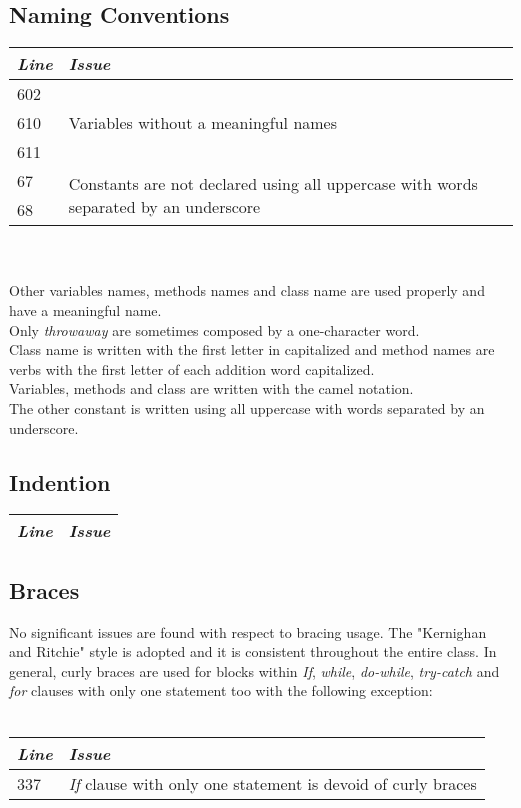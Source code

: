 \documentclass[11pt,a4paper]{report}
\begin{document}
\subsection{Naming Conventions}
\begin{tabularx}{\textwidth}{|l|X|}
	\hline
	\textit{Line} & \textit{Issue}\\
	\hline
	602 & \multirow{3}{*}{Variables without a meaningful names}\\
	610 & \\
	611 & \\
	\hline
	\hline
	67 & \multirow{2}{\linewidth}{{Constants are not declared using all uppercase with words separated by an underscore}}\\
	68 & \\
	\hline
\end{tabularx}
\\\\
Other variables names, methods names and class name are used properly and have a meaningful name.\\Only \textit{throwaway} are sometimes composed by a one-character word.\\Class name is written with the first letter in capitalized and method names are verbs with the first letter of each addition word capitalized.\\Variables, methods and class are written with the camel notation.\\The other constant is written using all uppercase with words separated by an underscore.
\subsection{Indention}
\begin{tabularx}{\textwidth}{|l|X|}
	\hline
	\textit{Line} & \textit{Issue}\\
	\hline
\end{tabularx}
\subsection{Braces}
No significant issues are found with respect to bracing usage. The "Kernighan and Ritchie" style is adopted and it is consistent throughout the entire class. In general, curly braces are used for blocks within \textit{If}, \textit{while}, \textit{do-while}, \textit{try-catch} and \textit{for} clauses with only one statement too with the following exception:
\\\\
\begin{tabularx}{\textwidth}{|l|X|}
	\hline
	\textit{Line} & \textit{Issue}\\
	\hline
	337 & \multirow{1}{*}{\textit{If} clause with only one statement is devoid of curly braces}\\
	\hline
\end{tabularx}
\end{document}
